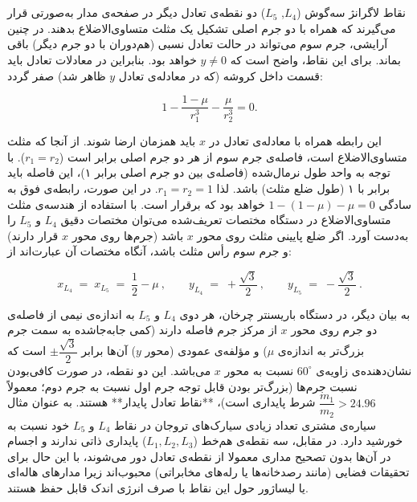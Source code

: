 \section{} نقاط لاگرانژ سه‌گوش ($L_4$, $L_5$)  
دو نقطه‌ی تعادل دیگر در صفحه‌ی مدار به‌صورتی قرار می‌گیرند که همراه با دو جرم اصلی تشکیل یک مثلث متساوی‌الاضلاع بدهند. در چنین آرایشی، جرم سوم می‌تواند در حالت تعادل نسبی (هم‌دوران با دو جرم دیگر) باقی بماند. برای این نقاط، واضح است که $y \neq 0$ خواهد بود. بنابراین در معادلات تعادل باید قسمت داخل کروشه (که در معادله‌ی تعادل $y$ ظاهر شد) صفر گردد:

$$1 - \dfrac{1-\mu}{r_1^3} - \dfrac{\mu}{r_2^3} = 0.$$

این رابطه همراه با معادله‌ی تعادل در $x$ باید همزمان ارضا شوند. از آنجا که مثلث متساوی‌الاضلاع است، فاصله‌ی جرم سوم از هر دو جرم اصلی برابر است ($r_1 = r_2$). با توجه به واحد طول نرمال‌شده (فاصله‌ی بین دو جرم اصلی برابر ۱)، این فاصله باید برابر با ۱ (طول ضلع مثلث) باشد. لذا $r_1 = r_2 = 1$. در این صورت، رابطه‌ی فوق به سادگی $1 - (1-\mu) - \mu = 0$ خواهد بود که برقرار است. با استفاده از هندسه‌ی مثلث متساوی‌الاضلاع در دستگاه مختصات تعریف‌شده می‌توان مختصات دقیق $L_4$ و $L_5$ را به‌دست آورد. اگر ضلع پایینی مثلث روی محور $x$ باشد (جرم‌ها روی محور $x$ قرار دارند) و جرم سوم رأس مثلث باشد، آنگاه مختصات آن عبارت‌اند از:

$$ 
x_{L_4} \;=\; x_{L_5} \;=\; \dfrac{1}{2} - \mu~, \qquad 
y_{L_4} \;=\; +\dfrac{\sqrt{3}}{2}~, \qquad 
y_{L_5} \;=\; -\dfrac{\sqrt{3}}{2}~.
$$

به بیان دیگر، در دستگاه باریسنتر چرخان، هر دوی $L_4$ و $L_5$ به اندازه‌ی نیمی از فاصله‌ی دو جرم روی محور $x$ از مرکز جرم فاصله دارند (کمی جابه‌جا‌شده به سمت جرم بزرگ‌تر به اندازه‌ی $\mu$) و مؤلفه‌ی عمودی (محور $y$) آن‌ها برابر $\pm\dfrac{\sqrt{3}}{2}$ است که نشان‌دهنده‌ی زاویه‌ی $60^\circ$ نسبت به محور $x$ می‌باشد. این دو نقطه، در صورت کافی‌بودن نسبت جرم‌ها (بزرگ‌تر بودن قابل توجه جرم اول نسبت به جرم دوم؛ معمولاً $\dfrac{m_1}{m_2} > 24.96$ شرط پایداری است)، **نقاط تعادل پایدار** هستند. به عنوان مثال سیاره‌ی مشتری تعداد زیادی سیارک‌های تروجان در نقاط $L_4$ و $L_5$ خود نسبت به خورشید دارد. در مقابل، سه نقطه‌ی هم‌خط ($L_1,L_2,L_3$) پایداری ذاتی ندارند و اجسام در آن‌ها بدون تصحیح مداری معمولا از نقطه‌ی تعادل دور می‌شوند، با این حال برای تحقیقات فضایی (مانند رصدخانه‌ها یا رله‌های مخابراتی) محبوب‌اند زیرا مدارهای هاله‌ای یا لیساژور حول این نقاط با صرف انرژی اندک قابل حفظ هستند.

